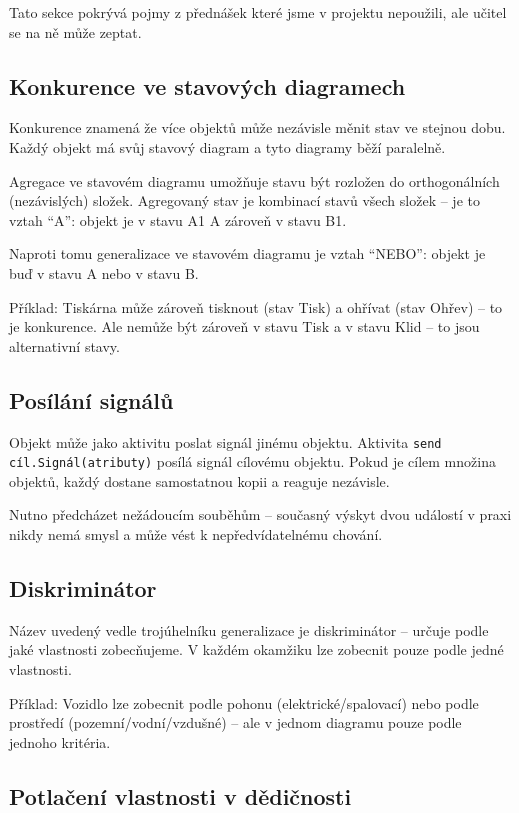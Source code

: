 \documentclass[12pt, a4paper]{article}
\begin{document}
Tato sekce pokrývá pojmy z přednášek které jsme v projektu nepoužili, ale učitel se na ně může zeptat.

\subsection{Konkurence ve stavových diagramech}

Konkurence znamená že více objektů může nezávisle měnit stav ve stejnou dobu. Každý objekt má svůj stavový diagram a tyto diagramy běží paralelně.

Agregace ve stavovém diagramu umožňuje stavu být rozložen do orthogonálních (nezávislých) složek. Agregovaný stav je kombinací stavů všech složek -- je to vztah ``A'': objekt je v stavu A1 A zároveň v stavu B1.

Naproti tomu generalizace ve stavovém diagramu je vztah ``NEBO'': objekt je buď v stavu A nebo v stavu B.

Příklad: Tiskárna může zároveň tisknout (stav Tisk) a ohřívat (stav Ohřev) -- to je konkurence. Ale nemůže být zároveň v stavu Tisk a v stavu Klid -- to jsou alternativní stavy.

\subsection{Posílání signálů}

Objekt může jako aktivitu poslat signál jinému objektu. Aktivita \texttt{send cíl.Signál(atributy)} posílá signál cílovému objektu. Pokud je cílem množina objektů, každý dostane samostatnou kopii a reaguje nezávisle.

Nutno předcházet nežádoucím souběhům -- současný výskyt dvou událostí v praxi nikdy nemá smysl a může vést k nepředvídatelnému chování.

\subsection{Diskriminátor}

Název uvedený vedle trojúhelníku generalizace je diskriminátor -- určuje podle jaké vlastnosti zobecňujeme. V každém okamžiku lze zobecnit pouze podle jedné vlastnosti.

Příklad: Vozidlo lze zobecnit podle pohonu (elektrické/spalovací) nebo podle prostředí (pozemní/vodní/vzdušné) -- ale v jednom diagramu pouze podle jednoho kritéria.

\subsection{Potlačení vlastnosti v dědičnosti}
\end{document}
